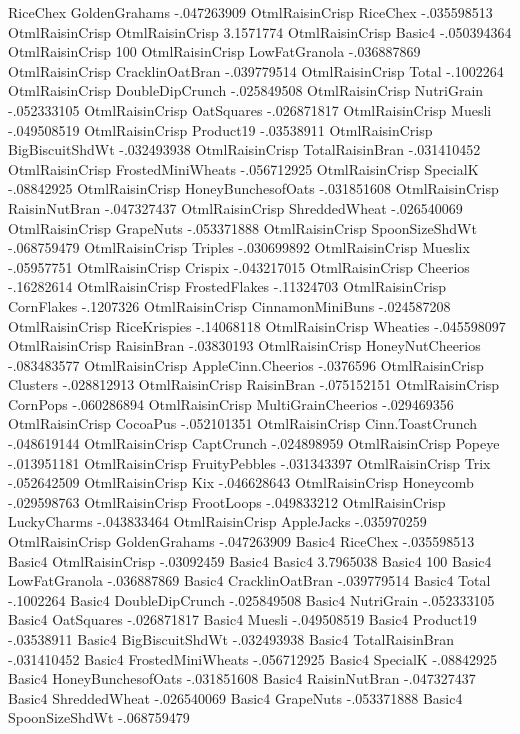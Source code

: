 RiceChex	GoldenGrahams	-.047263909
OtmlRaisinCrisp	RiceChex	-.035598513
OtmlRaisinCrisp	OtmlRaisinCrisp	3.1571774
OtmlRaisinCrisp	Basic4	-.050394364
OtmlRaisinCrisp	100%
OtmlRaisinCrisp	LowFatGranola	-.036887869
OtmlRaisinCrisp	CracklinOatBran	-.039779514
OtmlRaisinCrisp	Total	-.1002264
OtmlRaisinCrisp	DoubleDipCrunch	-.025849508
OtmlRaisinCrisp	NutriGrain	-.052333105
OtmlRaisinCrisp	OatSquares	-.026871817
OtmlRaisinCrisp	Muesli	-.049508519
OtmlRaisinCrisp	Product19	-.03538911
OtmlRaisinCrisp	BigBiscuitShdWt	-.032493938
OtmlRaisinCrisp	TotalRaisinBran	-.031410452
OtmlRaisinCrisp	FrostedMiniWheats	-.056712925
OtmlRaisinCrisp	SpecialK	-.08842925
OtmlRaisinCrisp	HoneyBunchesofOats	-.031851608
OtmlRaisinCrisp	RaisinNutBran	-.047327437
OtmlRaisinCrisp	ShreddedWheat	-.026540069
OtmlRaisinCrisp	GrapeNuts	-.053371888
OtmlRaisinCrisp	SpoonSizeShdWt	-.068759479
OtmlRaisinCrisp	Triples	-.030699892
OtmlRaisinCrisp	Mueslix	-.05957751
OtmlRaisinCrisp	Crispix	-.043217015
OtmlRaisinCrisp	Cheerios	-.16282614
OtmlRaisinCrisp	FrostedFlakes	-.11324703
OtmlRaisinCrisp	CornFlakes	-.1207326
OtmlRaisinCrisp	CinnamonMiniBuns	-.024587208
OtmlRaisinCrisp	RiceKrispies	-.14068118
OtmlRaisinCrisp	Wheaties	-.045598097
OtmlRaisinCrisp	RaisinBran	-.03830193
OtmlRaisinCrisp	HoneyNutCheerios	-.083483577
OtmlRaisinCrisp	AppleCinn.Cheerios	-.0376596
OtmlRaisinCrisp	Clusters	-.028812913
OtmlRaisinCrisp	RaisinBran	-.075152151
OtmlRaisinCrisp	CornPops	-.060286894
OtmlRaisinCrisp	MultiGrainCheerios	-.029469356
OtmlRaisinCrisp	CocoaPus	-.052101351
OtmlRaisinCrisp	Cinn.ToastCrunch	-.048619144
OtmlRaisinCrisp	CaptCrunch	-.024898959
OtmlRaisinCrisp	Popeye	-.013951181
OtmlRaisinCrisp	FruityPebbles	-.031343397
OtmlRaisinCrisp	Trix	-.052642509
OtmlRaisinCrisp	Kix	-.046628643
OtmlRaisinCrisp	Honeycomb	-.029598763
OtmlRaisinCrisp	FrootLoops	-.049833212
OtmlRaisinCrisp	LuckyCharms	-.043833464
OtmlRaisinCrisp	AppleJacks	-.035970259
OtmlRaisinCrisp	GoldenGrahams	-.047263909
Basic4	RiceChex	-.035598513
Basic4	OtmlRaisinCrisp	-.03092459
Basic4	Basic4	3.7965038
Basic4	100%
Basic4	LowFatGranola	-.036887869
Basic4	CracklinOatBran	-.039779514
Basic4	Total	-.1002264
Basic4	DoubleDipCrunch	-.025849508
Basic4	NutriGrain	-.052333105
Basic4	OatSquares	-.026871817
Basic4	Muesli	-.049508519
Basic4	Product19	-.03538911
Basic4	BigBiscuitShdWt	-.032493938
Basic4	TotalRaisinBran	-.031410452
Basic4	FrostedMiniWheats	-.056712925
Basic4	SpecialK	-.08842925
Basic4	HoneyBunchesofOats	-.031851608
Basic4	RaisinNutBran	-.047327437
Basic4	ShreddedWheat	-.026540069
Basic4	GrapeNuts	-.053371888
Basic4	SpoonSizeShdWt	-.068759479
